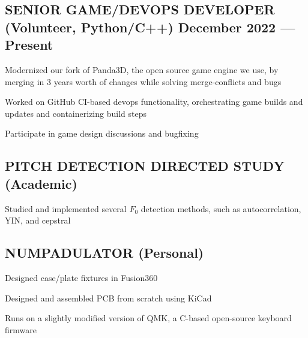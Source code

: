 \documentclass[letter,10pt]{article}
\begin{document}
\subsection{{SENIOR GAME/DEVOPS DEVELOPER (Volunteer, Python/C++)} \hfill December 2022 --- Present}
\begin{zitemize}
\item Modernized our fork of Panda3D, the open source game engine we use, by merging in 3 years worth of changes while solving merge-conflicts and bugs
\item Worked on GitHub CI-based devops functionality, orchestrating game builds and updates and containerizing build steps
\item Participate in game design discussions and bugfixing
\end{zitemize}

\subsection{{PITCH DETECTION DIRECTED STUDY (Academic)} \hfill {}}
\begin{zitemize}
\item Studied and implemented several $F_0$ detection methods, such as autocorrelation, YIN, and cepstral
\end{zitemize}

\subsection{{NUMPADULATOR (Personal)} \hfill {}}
\begin{zitemize}
\item Designed case/plate fixtures in Fusion360
\item Designed and assembled PCB from scratch using KiCad
\item Runs on a slightly modified version of QMK, a C-based open-source keyboard firmware
\end{zitemize}
\end{document}
